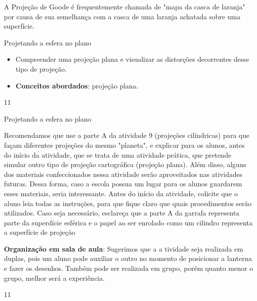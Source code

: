 A Projeção de Goode é frequentemente chamada de "mapa da casca de laranja" por causa de sua semelhança com a casca de uma laranja  achatada sobre uma superfície.
\clearpage
\def\currentcolor{session1}
\begin{ObjetivoEsp}{Projetando a esfera no plano}
{
  \begin{itemize}
  \item Compreender uma projeção plana e visualizar as distorções decorrentes desse tipo de projeção.
  \item \textbf{Conceitos abordados}: projeção plana.
  \end{itemize}
}{1}{1}
\end{ObjetivoEsp}
\begin{Recomenda}{Projetando a esfera no plano}
{
  Recomendamos que use a parte A da atividade 9 (projeções cilíndricas) para que façam diferentes projeções do mesmo "planeta", e explicar para os alunos, antes do início da atividade, que se trata de uma atividade prática, que pretende simular outro tipo de projeção cartográfica (projeção plana). Além disso, alguns dos materiais confeccionados nessa atividade serão aproveitados nas atividades futuras. Dessa forma, caso a escola possua um lugar para os alunos guardarem esses materiais, seria interessante. Antes do início da atividade, colicite que o aluno leia todas as instruções, para que fique claro que quais procedimentos serão utilizados. Caso seja necessário, esclareça que a parte A da garrafa representa parte da superdície esférica e o papel ao ser enrolado como um cilindro representa a superfície de projeção

  \textbf{Organização em sala de aula}: Sugerimos que a a tividade seja realizada em duplas, pois um aluno pode auxiliar o outro no momento de posicionar a lanterna e fazer os desenhos. Também pode ser realizada em grupo, porém quanto menor o grupo, melhor será a experiência.
}{1}{1}
\end{Recomenda}
\clearmargin


